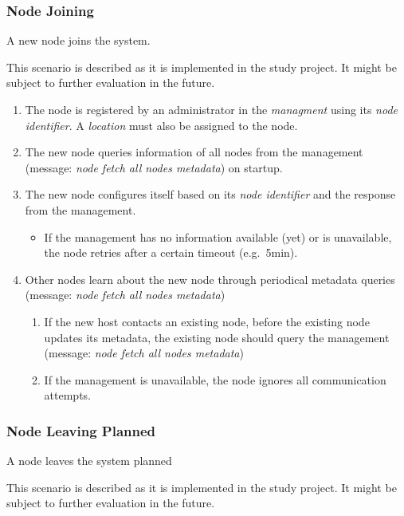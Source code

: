 \subsubsection{Node Joining}\label{sec:scenario-node-join}
A new node joins the system.

This scenario is described as it is implemented in the study project. It might be subject to further evaluation in the future.

\begin{enumerate}
    \item The node is registered by an administrator in the \emph{managment} using its \emph{node identifier}. A \emph{location} must also be assigned to the node. %
    \item The new node queries information of all nodes from the management (message: \emph{node fetch all nodes metadata}) on startup. 
    \item The new node configures itself based on its \emph{node identifier} and the response from the management.
        \begin{itemize}
            \item If the management has no information available (yet) or is unavailable, the node retries after a certain timeout (e.g.\ 5min).
        \end{itemize}
    \item Other nodes learn about the new node through periodical metadata queries (message: \emph{node fetch all nodes metadata}) %
        \begin{enumerate}
            \item If the new host contacts an existing node, before the existing node updates its metadata, the existing node should query the management (message: \emph{node fetch all nodes metadata})
            \item If the management is unavailable, the node ignores all communication attempts.
        \end{enumerate}
\end{enumerate}

\subsubsection{Node Leaving Planned}\label{sec:scenario-node-leave-planned}
A node leaves the system planned

This scenario is described as it is implemented in the study project. It might be subject to further evaluation in the future.

